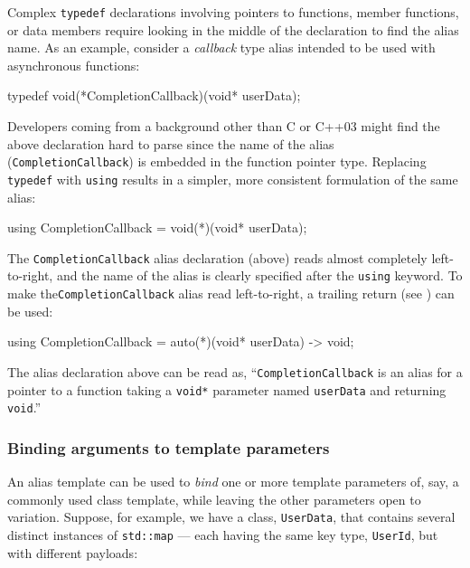 Complex \lstinline!typedef! declarations involving pointers to functions,
member functions, or data members require looking in the middle of the
declaration to find the alias name. As an example, consider a
\emph{callback} type alias intended to be used with asynchronous functions:

\newpage%
\begin{emcppslisting}
typedef void(*CompletionCallback)(void* userData);
\end{emcppslisting}

\noindent Developers coming from a background other than C or C++03 might find the
above declaration hard to parse since the name of the alias
(\lstinline!CompletionCallback!) is embedded in the function pointer type.
Replacing \lstinline!typedef! with \lstinline!using! results in a simpler,
more consistent formulation of the same alias:

\begin{emcppslisting}
using CompletionCallback = void(*)(void* userData);
\end{emcppslisting}

\noindent The \lstinline!CompletionCallback! alias declaration (above) reads almost
completely left-to-right, and the name of the alias is clearly
specified after the \lstinline!using! keyword. To make the\linebreak[4]
\lstinline!CompletionCallback! alias read left-to-right, a
  trailing return (see )
can be used:

  \begin{emcppslisting}
  using CompletionCallback = auto(*)(void* userData) -> void;
  \end{emcppslisting}

\noindent The alias declaration above can be read as,
  ``\lstinline!CompletionCallback! is an alias for a pointer to a
  function taking a \lstinline!void*! parameter named \lstinline!userData! and
  returning \lstinline!void!.''

\subsubsection[Binding arguments to template parameters]{Binding arguments to template parameters}\label{binding-template-arguments}

An alias template can be used to \emph{bind} one or more template
parameters of, say, a commonly used class template, while leaving the
other parameters open to variation. Suppose, for example, we have a class, \lstinline!UserData!, that contains
several distinct instances of \lstinline!std::map! --- each
having the same key type, \lstinline!UserId!, but with different payloads:

